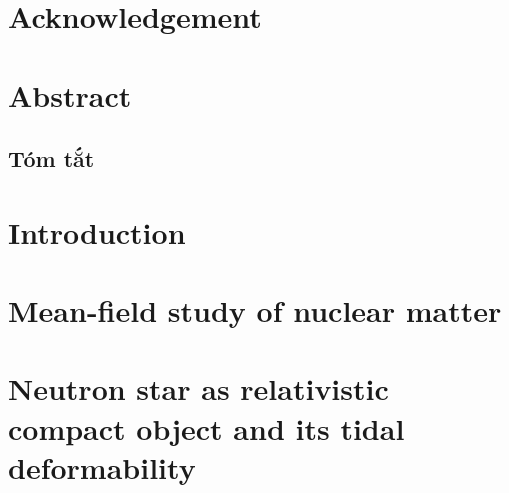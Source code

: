 \documentclass[a4paper,12pt]{article}
\theoremstyle{plain}\newtheorem{ques}{Question}
\theoremstyle{definition}\newtheorem*{ans}{Answer}
\begin{document}
        \restoregeometry
        \tableofcontents
        \setcounter{page}{1}

        \clearpage
        \section*{Acknowledgement}
        \label{chap:acknowledgement}
        

        \clearpage
        \printglossary[title={List of Abbreviations}]
        \clearpage
        \listoftables
        \listoffigures

        \captionsetup{width=0.9\linewidth}

        \clearpage
        \section*{Abstract}
        \label{chap:abstract}
        

        \clearpage
        \begin{otherlanguage}{vietnamese}
        \section*{Tóm tắt}
        \label{chap:abstract_vn}
        
        \end{otherlanguage}

        \clearpage
        \section{Introduction}
        \setcounter{page}{1}
        \label{chap:intro}
        

        \section{Mean-field study of nuclear matter}
        \label{chap:hf}
        

        \section{Neutron star as relativistic compact object and its tidal deformability}
        \label{chap:ns_prop}
        
\end{document}
